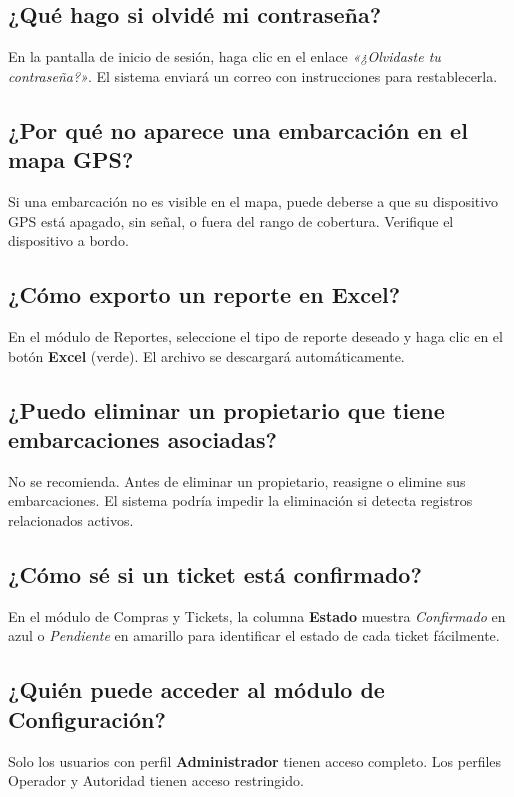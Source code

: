 \documentclass[12pt,a4paper]{report}
\begin{document}
\subsection*{¿Qué hago si olvidé mi contraseña?}
En la pantalla de inicio de sesión, haga clic en el enlace \textit{«¿Olvidaste tu contraseña?»}. El sistema enviará un correo con instrucciones para restablecerla.

\subsection*{¿Por qué no aparece una embarcación en el mapa GPS?}
Si una embarcación no es visible en el mapa, puede deberse a que su dispositivo GPS está apagado, sin señal, o fuera del rango de cobertura. Verifique el dispositivo a bordo.

\subsection*{¿Cómo exporto un reporte en Excel?}
En el módulo de Reportes, seleccione el tipo de reporte deseado y haga clic en el botón \textbf{Excel} (verde). El archivo se descargará automáticamente.

\subsection*{¿Puedo eliminar un propietario que tiene embarcaciones asociadas?}
No se recomienda. Antes de eliminar un propietario, reasigne o elimine sus embarcaciones. El sistema podría impedir la eliminación si detecta registros relacionados activos.

\subsection*{¿Cómo sé si un ticket está confirmado?}
En el módulo de Compras y Tickets, la columna \textbf{Estado} muestra \textit{Confirmado} en azul o \textit{Pendiente} en amarillo para identificar el estado de cada ticket fácilmente.

\subsection*{¿Quién puede acceder al módulo de Configuración?}
Solo los usuarios con perfil \textbf{Administrador} tienen acceso completo. Los perfiles Operador y Autoridad tienen acceso restringido.

\end{document}

